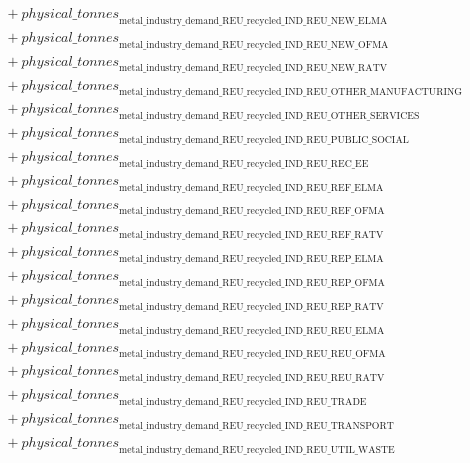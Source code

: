 \documentclass[11pt]{article}
\begin{document}
\begin{align*}
&\quad {}+ {physical\_tonnes}_{\text{metal\_industry\_demand\_REU\_recycled\_IND\_REU\_NEW\_ELMA}}\\
&\quad {}+ {physical\_tonnes}_{\text{metal\_industry\_demand\_REU\_recycled\_IND\_REU\_NEW\_OFMA}}\\
&\quad {}+ {physical\_tonnes}_{\text{metal\_industry\_demand\_REU\_recycled\_IND\_REU\_NEW\_RATV}}\\
&\quad {}+ {physical\_tonnes}_{\text{metal\_industry\_demand\_REU\_recycled\_IND\_REU\_OTHER\_MANUFACTURING}}\\
&\quad {}+ {physical\_tonnes}_{\text{metal\_industry\_demand\_REU\_recycled\_IND\_REU\_OTHER\_SERVICES}}\\
&\quad {}+ {physical\_tonnes}_{\text{metal\_industry\_demand\_REU\_recycled\_IND\_REU\_PUBLIC\_SOCIAL}}\\
&\quad {}+ {physical\_tonnes}_{\text{metal\_industry\_demand\_REU\_recycled\_IND\_REU\_REC\_EE}}\\
&\quad {}+ {physical\_tonnes}_{\text{metal\_industry\_demand\_REU\_recycled\_IND\_REU\_REF\_ELMA}}\\
&\quad {}+ {physical\_tonnes}_{\text{metal\_industry\_demand\_REU\_recycled\_IND\_REU\_REF\_OFMA}}\\
&\quad {}+ {physical\_tonnes}_{\text{metal\_industry\_demand\_REU\_recycled\_IND\_REU\_REF\_RATV}}\\
&\quad {}+ {physical\_tonnes}_{\text{metal\_industry\_demand\_REU\_recycled\_IND\_REU\_REP\_ELMA}}\\
&\quad {}+ {physical\_tonnes}_{\text{metal\_industry\_demand\_REU\_recycled\_IND\_REU\_REP\_OFMA}}\\
&\quad {}+ {physical\_tonnes}_{\text{metal\_industry\_demand\_REU\_recycled\_IND\_REU\_REP\_RATV}}\\
&\quad {}+ {physical\_tonnes}_{\text{metal\_industry\_demand\_REU\_recycled\_IND\_REU\_REU\_ELMA}}\\
&\quad {}+ {physical\_tonnes}_{\text{metal\_industry\_demand\_REU\_recycled\_IND\_REU\_REU\_OFMA}}\\
&\quad {}+ {physical\_tonnes}_{\text{metal\_industry\_demand\_REU\_recycled\_IND\_REU\_REU\_RATV}}\\
&\quad {}+ {physical\_tonnes}_{\text{metal\_industry\_demand\_REU\_recycled\_IND\_REU\_TRADE}}\\
&\quad {}+ {physical\_tonnes}_{\text{metal\_industry\_demand\_REU\_recycled\_IND\_REU\_TRANSPORT}}\\
&\quad {}+ {physical\_tonnes}_{\text{metal\_industry\_demand\_REU\_recycled\_IND\_REU\_UTIL\_WASTE}}\\

\end{align*}
\end{document}
